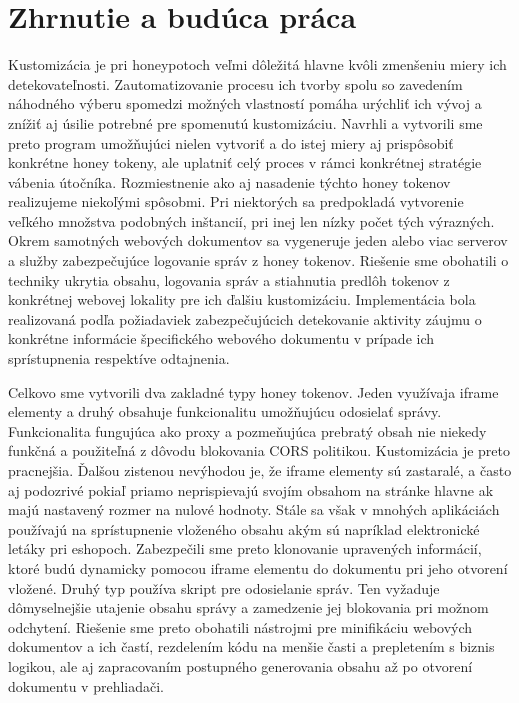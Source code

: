 \documentclass[conference, 11pt,slovak,a4paper,twoside]{IEEEtran}
\begin{document}
\section{Zhrnutie a budúca práca}

Kustomizácia je pri honeypotoch veľmi dôležitá hlavne kvôli zmenšeniu miery ich detekovateľnosti. Zautomatizovanie procesu ich tvorby spolu so zavedením náhodného výberu spomedzi možných vlastností pomáha urýchliť ich vývoj a znížiť aj úsilie potrebné pre spomenutú kustomizáciu. Navrhli a vytvorili sme preto program umožňujúci nielen vytvoriť a do istej miery aj prispôsobiť konkrétne honey tokeny, ale uplatniť celý proces v rámci konkrétnej stratégie vábenia útočníka. Rozmiestnenie ako aj nasadenie týchto honey tokenov realizujeme niekoľými spôsobmi. Pri niektorých sa predpokladá vytvorenie veľkého množstva podobných inštancií, pri inej len nízky počet tých výrazných. Okrem samotných webových dokumentov sa vygeneruje jeden alebo viac serverov a služby zabezpečujúce logovanie správ z honey tokenov. Riešenie sme obohatili o techniky ukrytia obsahu, logovania správ a stiahnutia predlôh tokenov z konkrétnej webovej lokality pre ich ďalšiu kustomizáciu. Implementácia bola realizovaná podľa požiadaviek zabezpečujúcich detekovanie aktivity záujmu o konkrétne informácie špecifického webového dokumentu v prípade ich sprístupnenia respektíve odtajnenia.

Celkovo sme vytvorili dva zakladné typy honey tokenov. Jeden využívaja iframe elementy a druhý obsahuje funkcionalitu umožňujúcu odosielať správy. Funkcionalita fungujúca ako proxy a pozmeňujúca prebratý obsah nie niekedy funkčná a použiteľná z dôvodu blokovania CORS politikou. Kustomizácia je preto pracnejšia. Ďalšou zistenou nevýhodou je, že iframe elementy sú zastaralé, a často aj podozrivé pokiaľ priamo neprispievajú svojím obsahom na stránke hlavne ak majú nastavený rozmer na nulové hodnoty. Stále sa však v mnohých aplikáciách používajú na sprístupnenie vloženého obsahu akým sú napríklad elektronické letáky pri eshopoch. Zabezpečili sme preto klonovanie upravených informácií, ktoré budú dynamicky pomocou iframe elementu do dokumentu pri jeho otvorení vložené. Druhý typ používa skript pre odosielanie správ. Ten vyžaduje dômyselnejšie utajenie obsahu správy a zamedzenie jej blokovania pri možnom odchytení. Riešenie sme preto obohatili nástrojmi pre minifikáciu webových dokumentov a ich častí, rezdelením kódu na menšie časti a prepletením s biznis logikou, ale aj zapracovaním postupného generovania obsahu až po otvorení dokumentu v prehliadači.
\end{document}
